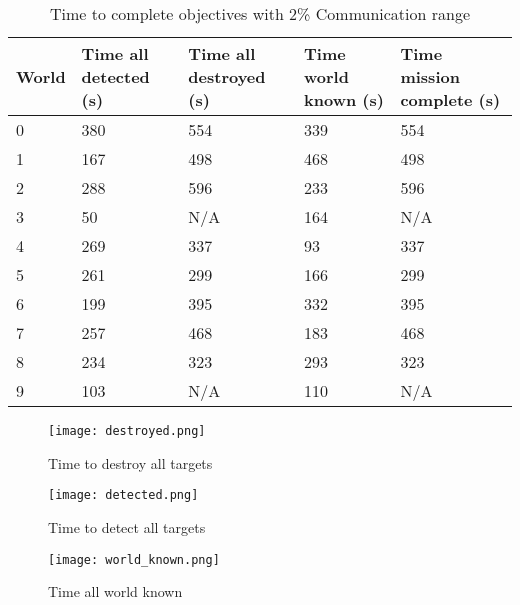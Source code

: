 \begin{table}[H]
	\caption{Time to complete objectives with 2\% Communication range}
	\centering
	\label{tab:comm2}
	
	\begin{tabular}{|p{1cm}|p{1.5cm}|p{1.75cm}|p{1.5cm}|p{1.5cm}|}
		\hline
		World & Time all detected (s) & Time all destroyed (s) & Time world known (s) & Time mission complete (s) \\
		\hline
		0&380&554&339&554 \\ \hline
		1&167&498&468&498 \\ \hline
		2&288&596&233&596 \\ \hline
		3&50& N/A &164& N/A\\ \hline
		4&269&337&93&337 \\ \hline
		5&261&299&166&299 \\ \hline
		6&199&395&332&395 \\ \hline
		7&257&468&183&468 \\ \hline
		8&234&323&293&323 \\ \hline
		9&103& N/A &110& N/A\\ \hline
	\end{tabular}
\end{table}

\begin{figure}[H]
	\centering
	\texttt{[image: destroyed.png]}
	\caption{Time to destroy all targets}
	\label{fig:time_to_destroy}
\end{figure}

\begin{figure}[H]
	\centering
	\texttt{[image: detected.png]}
	\caption{Time to detect all targets}
	\label{fig:time_to_detect}
\end{figure}

\begin{figure}[H]
	\centering
	\texttt{[image: world\_known.png]}
	\caption{Time all world known}
	\label{fig:time_all_world_known}
\end{figure}


